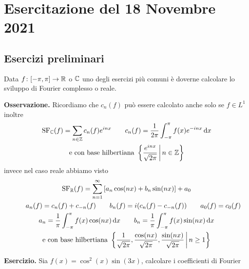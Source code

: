 %
%

\section{Esercitazione del 18 Novembre 2021}

\subsection{Esercizi preliminari}

Data $f \colon [-\pi, \pi] \to \mathbb R$ o $\mathbb C$ uno degli esercizi più comuni è doverne calcolare lo sviluppo di Fourier complesso o reale.

\textbf{Osservazione.}
Ricordiamo che $c_n(f)$ può essere calcolato anche solo se $f \in L^1$ inoltre
$$
\begin{gathered}
	\operatorname{SF}_\mathbb C(f) = \sum_{n \in \mathbb Z} c_n(f) e^{inx}
	\qquad
	c_n(f) = \frac{1}{2\pi} \int_{-\pi}^\pi f(x) e^{-inx} \,\mathrm{d} x \\
	\text{e con base hilbertiana } \left\{ \frac{e^{inx}}{\sqrt{2\pi}} \,\middle|\, n \in \mathbb Z \right\}
\end{gathered}
$$
invece nel caso reale abbiamo visto
$$
\begin{gathered}
	\operatorname{SF}_\mathbb R(f) = \sum_{n=1}^\infty \left[ a_n \cos(nx) + b_n \sin(nx) \right] + a_0 \\
	\qquad
	a_n(f) = c_n(f) + c_{-n}(f)
	\qquad
	b_n(f) = i(c_n(f) - c_{-n}(f))
	\qquad
	a_0(f) = c_0(f) \\
	a_n = \frac{1}{\pi} \int_{-\pi}^\pi f(x) \cos(nx) \,\mathrm{d} x
	\qquad
	b_n = \frac{1}{\pi} \int_{-\pi}^\pi f(x) \sin(nx) \,\mathrm{d} x \\
	\text{e con base hilbertiana } \left\{ \frac{1}{\sqrt{2\pi}}, \frac{\cos(nx)}{\sqrt{2\pi}}, \frac{\sin(nx)}{\sqrt{2\pi}} \,\middle|\, n \geq 1 \right\}
\end{gathered}
$$

\textbf{Esercizio.}
Sia $f(x) = \cos^2(x) \sin(3x)$, calcolare i coefficienti di Fourier

